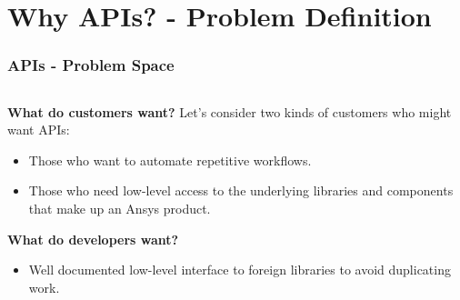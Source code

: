 \documentclass[t]{beamer}
\begin{document}
\section{Why APIs? - Problem Definition}
\begin{frame}
  \frametitle{APIs - Problem Space}

  \begin{columns}[T]
    \begin{column}{.6\textwidth}


      \textbf{What do customers want?} Let's consider two kinds of customers
      who might want APIs:

      \begin{itemize}
      \item{Those who want to automate repetitive workflows.}
      \item{Those who need low-level access to the underlying libraries and
        components that make up an Ansys product.}
      \end{itemize}



      \textbf{What do developers want?}

      \begin{itemize}
      \item{Well documented low-level interface to foreign libraries to avoid
        duplicating work.}
      \end{itemize}


    \end{column}


\end{columns}
\end{frame}
\end{document}
